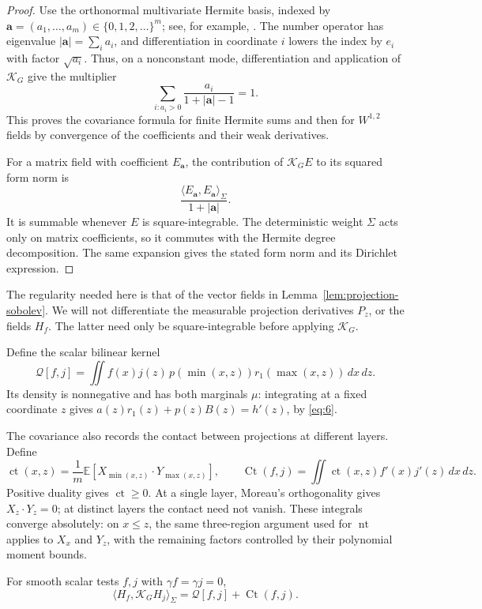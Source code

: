 \begin{proof}
Use the orthonormal multivariate Hermite basis, indexed by
\(\mathbf a=(a_1,\ldots,a_m)\in\{0,1,2,\ldots\}^m\); see, for example,
\cite[Sections 5--6]{Bell2015}. The number operator has eigenvalue
\(|\mathbf a|=\sum_i a_i\), and differentiation in coordinate \(i\)
lowers the index by \(e_i\) with factor \(\sqrt{a_i}\). Thus, on a
nonconstant mode, differentiation and application of \(\mathcal K_G\)
give the multiplier
\[
 \sum_{i:a_i>0}\frac{a_i}{1+|\mathbf a|-1}=1.
\]
This proves the covariance formula for finite Hermite sums and then
for \(W^{1,2}\) fields by convergence of the coefficients and their
weak derivatives.

For a matrix field with coefficient \(E_{\mathbf a}\), the
contribution of \(\mathcal K_GE\) to its squared form norm is
\[
 \frac{\langle E_{\mathbf a},E_{\mathbf a}\rangle_\Sigma}
      {1+|\mathbf a|}.
\]
It is summable whenever \(E\) is square-integrable. The deterministic
weight \(\Sigma\) acts only on matrix coefficients, so it commutes
with the Hermite degree decomposition. The same expansion gives
the stated form norm and its Dirichlet expression.
\end{proof}

The regularity needed here is that of the vector fields in
Lemma~\ref{lem:projection-sobolev}. We will not differentiate the
measurable projection derivatives \(P_z\), or the fields \(H_f\).
The latter need only be square-integrable before applying
\(\mathcal K_G\).

Define the scalar bilinear kernel
\[
 \mathcal Q[f,j]
  =\iint f(x)j(z)\,p(\min(x,z))r_1(\max(x,z))\,dx\,dz.
\]
Its density is nonnegative and has both marginals \(\mu\):
integrating at a fixed coordinate \(z\) gives
\(a(z)r_1(z)+p(z)B(z)=h'(z)\), by \eqref{eq:6}.

The covariance also records the contact between projections at different
layers. Define
\[
 \operatorname{ct}(x,z)
 =\frac1m\mathbb E[X_{\min(x,z)}\cdot Y_{\max(x,z)}],
 \qquad
 \operatorname{Ct}(f,j)
 =\iint\operatorname{ct}(x,z)f'(x)j'(z)\,dx\,dz.
\]
Positive duality gives $\operatorname{ct}\ge0$. At a single layer,
Moreau's orthogonality gives $X_z\cdot Y_z=0$; at distinct layers
the contact need not vanish. These integrals converge absolutely:
on $x\le z$, the same three-region argument used for
$\operatorname{nt}$ applies to $X_x$ and $Y_z$, with the remaining
factors controlled by their polynomial moment bounds.

\begin{lemma}\label{lem:layer-covariance}
 For smooth scalar tests \(f,j\) with \(\gamma f=\gamma j=0\),
 \begin{equation}\tag{13}\label{eq:13}
  \langle H_f,\mathcal K_G H_j\rangle_\Sigma
    =\mathcal Q[f,j]+\operatorname{Ct}(f,j).
 \end{equation}
\end{lemma}

